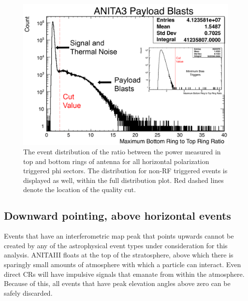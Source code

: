 \begin{figure}
	\centering
	\includegraphics[height=0.5\textheight]{figures/payloadBlastDistribution}
	\caption{The event distribution of the ratio between the power measured in top and bottom rings of antenna for all horizontal polarization triggered phi sectors.  The distribution for non-RF triggered events is displayed as well, within the full distribution plot.  Red dashed lines denote the location of the quality cut.}
	\label{fig:payloadBlastDist}
\end{figure}
	
		
		
	\subsection{Downward pointing, above horizontal events}
		Events that have an interferometric map peak that points upwards cannot be created by any of the astrophysical event types under consideration for this analysis.  ANITAIII floats at the top of the stratosphere, above which there is sparingly small amounts of atmosphere with which a particle can interact.  Even direct CRs will have impulsive signals that emanate from within the atmosphere.  Because of this, all events that have peak elevation angles above zero can be safely discarded.
		
